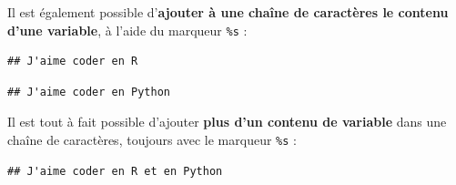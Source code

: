 \documentclass[12pt,]{book}
\newenvironment{Shaded}{\begin{snugshade}}{\end{snugshade}}
\newcommand{\SpecialCharTok}[1]{\textcolor[rgb]{0.00,0.00,0.00}{#1}}
\newcommand{\StringTok}[1]{\textcolor[rgb]{0.31,0.60,0.02}{#1}}
\newcommand{\OperatorTok}[1]{\textcolor[rgb]{0.81,0.36,0.00}{\textbf{#1}}}
\newcommand{\BuiltInTok}[1]{#1}
\newcommand{\NormalTok}[1]{#1}
\numberwithin{equation}{section}
\numberwithin{countremarque}{section}
\begin{document}
Il est également possible d'\textbf{ajouter à une chaîne de caractères
le contenu d'une variable}, à l'aide du marqueur \texttt{\%s} :

\begin{Shaded}
\end{Shaded}

\begin{lstlisting}
## J'aime coder en R
\end{lstlisting}

\begin{Shaded}
\end{Shaded}

\begin{lstlisting}
## J'aime coder en Python
\end{lstlisting}

Il est tout à fait possible d'ajouter \textbf{plus d'un contenu de
variable} dans une chaîne de caractères, toujours avec le marqueur
\texttt{\%s} :

\begin{Shaded}
\end{Shaded}

\begin{lstlisting}
## J'aime coder en R et en Python
\end{lstlisting}
\end{document}
